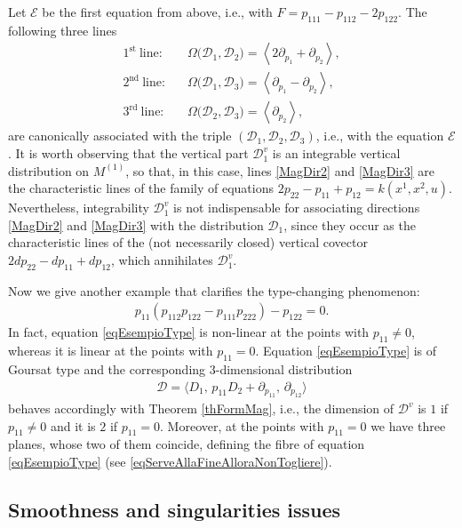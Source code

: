 \documentclass[10pt,a4paper]{amsart}
\newcommand{\D}{\mathcal{D}}
\newcommand{\E}{\mathcal{E}}
\newcommand{\Span}[1]{\left\langle #1 \right\rangle}
\newcommand{\St}{^\textrm{st}}
\newcommand{\Rd}{^\textrm{rd}}
\newcommand{\Nd}{^\textrm{nd}}
\numberwithin{equation}{section}
\begin{document}
Let $\E$ be the f\/irst equation from above, i.e., with $F=p_{111}-p_{112}-2p_{122}$. The following three lines
 \begin{align}
1\St \ \textrm{line:} \quad & \Omega\big(\D_1,\D_2)=\Span{ 2\partial_{p_1}+\partial_{p_2}},\\
2\Nd \ \textrm{line:} \quad & \Omega\big(\D_1,\D_3)=\Span{ \partial_{p_1}-\partial_{p_2}},\label{MagDir2}\\
3\Rd \ \textrm{line:} \quad & \Omega\big(\D_2,\D_3)=\Span{ \partial_{p_2}},\label{MagDir3}
\end{align}
 are canonically associated with the triple $(\D_1,\D_2,\D_3)$, i.e., with the equation $\E$. It is worth observing that the vertical part $\D_1^v$ is an integrable vertical distribution on $M^{(1)}$, so that, in this case, lines \eqref{MagDir2} and \eqref{MagDir3} are the characteristic lines of the family of equations $2p_{22}-p_{11}+p_{12}=k(x^1,x^2,u)$.
Nevertheless, integrability $\D_1^v$ is not indispensable for associating directions \eqref{MagDir2} and \eqref{MagDir3} with the distribution $\D_1$, since they occur as the characteristic lines
of the (not necessarily closed) vertical covector $2dp_{22}-dp_{11}+dp_{12}$,
which annihilates $\D_1^v$.

Now we give another example that clarif\/ies the type-changing phenomenon:
\begin{gather}\label{eqEsempioType}
p_{11}(p_{112}p_{122}-p_{111}p_{222})-p_{122}=0 .
\end{gather}
In fact, equation \eqref{eqEsempioType} is non-linear at the points with $p_{11}\neq 0$, whereas it is linear at the points with $p_{11}=0$. Equation \eqref{eqEsempioType} is of Goursat type and the corresponding $3$-dimensional distribution
\begin{gather*}
\mathcal{D}=\langle D_1,\,p_{11}D_2+\partial_{p_{11}},\,\partial_{p_{12}} \rangle
\end{gather*}
behaves accordingly with Theorem \ref{thFormMag}, i.e., the dimension of $\mathcal{D}^v$ is $1$ if $p_{11}\neq 0$ and it is $2$ if $p_{11}=0$. Moreover, at the points with $p_{11}=0$ we have three planes, whose two of them coincide, def\/ining the f\/ibre of equation \eqref{eqEsempioType} (see \eqref{eqServeAllaFineAlloraNonTogliere}).

\subsection{Smoothness and singularities issues}\label{sezChiarificatrice}
\end{document}
